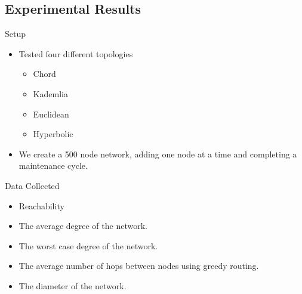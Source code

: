 \documentclass[11pt]{beamer}
\begin{document}
\subsection{Experimental Results}


\begin{frame}{Setup}
	\begin{itemize}
		\item Tested four different topologies
		\begin{itemize}
			\item Chord
			\item Kademlia
			\item Euclidean
			\item Hyperbolic
		\end{itemize}
		\item We create a 500 node network, adding one node at a time and completing a maintenance cycle.
	\end{itemize}
\end{frame}

\begin{frame}{Data Collected}
	\begin{itemize}
		\item Reachability
		\item The average degree of the network. 
		\item The worst case degree of the network.
		\item The average number of hops between nodes using greedy routing.
		\item The diameter of the network.  
		
	\end{itemize}
\end{frame}

\end{document}
